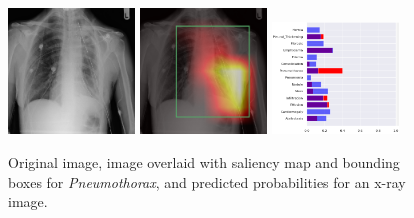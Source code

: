 \documentclass[12pt,oneside,a4paper]{report}
\begin{document}
\begin{figure}[H]
  \centering
  \includegraphics[width=0.3\textwidth]{images/preds/pneumothorax}\hspace{0.01\textwidth}%
  \includegraphics[width=0.3\textwidth]{images/preds/pneumothorax_cam}\hspace{0.01\textwidth}%
  \includegraphics[width=0.3\textwidth]{images/preds/pneumothorax_probs}\\[0.01\textwidth]
  \caption{Original image, image overlaid with saliency map and bounding boxes
    for \emph{Pneumothorax}, and predicted probabilities for an x-ray image.}
  \label{examples_8}
\end{figure}
\end{document}
